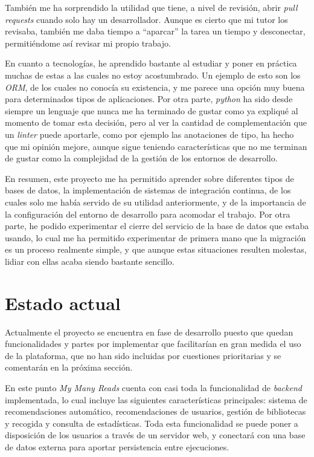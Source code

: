 También me ha sorprendido la utilidad que tiene, a nivel de revisión, abrir \textit{pull requests} cuando solo hay un desarrollador. Aunque es cierto que mi tutor los revisaba, también me daba tiempo a ``aparcar'' la tarea un tiempo y desconectar, permitiéndome así revisar mi propio trabajo.

En cuanto a tecnologías, he aprendido bastante al estudiar y poner en práctica muchas de estas a las cuales no estoy acostumbrado. Un ejemplo de esto son los \textit{ORM}, de los cuales no conocía su existencia, y me parece una opción muy buena para determinados tipos de aplicaciones. Por otra parte, \textit{python} ha sido desde siempre un lenguaje que nunca me ha terminado de gustar como ya expliqué al momento de tomar esta decisión, pero al ver la cantidad de complementación que un \textit{linter} puede aportarle, como por ejemplo las anotaciones de tipo, ha hecho que mi opinión mejore, aunque sigue teniendo características que no me terminan de gustar como la complejidad de la gestión de los entornos de desarrollo.

En resumen, este proyecto me ha permitido aprender sobre diferentes tipos de bases de datos, la implementación de sistemas de integración continua, de los cuales solo me había servido de su utilidad anteriormente, y de la importancia de la configuración del entorno de desarrollo para acomodar el trabajo. Por otra parte, he podido experimentar el cierre del servicio de la base de datos que estaba usando, lo cual me ha permitido experimentar de primera mano que la migración es un proceso realmente simple, y que aunque estas situaciones resulten molestas, lidiar con ellas acaba siendo bastante sencillo.

\section{Estado actual}

Actualmente el proyecto se encuentra en fase de desarrollo puesto que quedan funcionalidades y partes por implementar que facilitarían en gran medida el uso de la plataforma, que no han sido incluidas por cuestiones prioritarias y se comentarán en la próxima sección.

En este punto \textit{My Many Reads} cuenta con casi toda la funcionalidad de \textit{backend} implementada, lo cual incluye las siguientes características principales: sistema de recomendaciones automático, recomendaciones de usuarios, gestión de bibliotecas y recogida y consulta de estadísticas. Toda esta funcionalidad se puede poner a disposición de los usuarios a través de un servidor web, y conectará con una base de datos externa para aportar persistencia entre ejecuciones.

